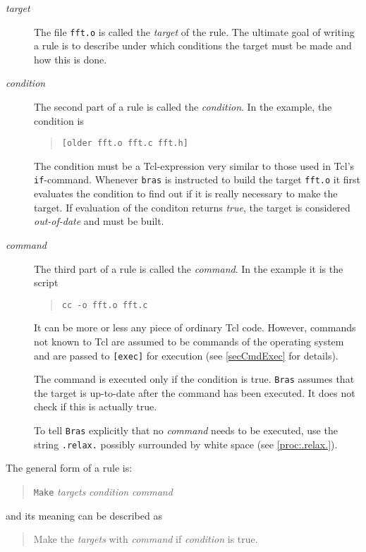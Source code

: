 \documentclass[11pt]{scrartcl}
\makeatletter
\newcommand{\bras}{\texttt{bras}}
\newcommand{\Bras}{\texttt{Bras}}
\newcommand{\Index}[1]{#1\index{#1}}
\newcommand{\Indextt}[1]{\texttt{#1}\index{#1@\texttt{#1}}}
\makeatother
\begin{document}
\begin{description}
\item[\textit{target}] The file \texttt{fft.o} is called the
  \textit{target} of the rule. The ultimate goal of writing a rule is
  to describe under which conditions the target must be made and how
  this is done. 
\item[\textit{condition}] The second part of a rule
  is called the \textit{condition}. In the example, the condition is
  \begin{quote}
  \texttt{[older fft.o {fft.c fft.h}]}
  \end{quote}
  The condition must be a Tcl-expression very similar to
  those used in Tcl's \texttt{if}-command. Whenever \bras{} is
  instructed to build the target \texttt{fft.o} it first evaluates the
  condition to find out if it is really necessary to make the
  target. If evaluation of the conditon returns \textit{true}, the
  target is considered \textit{out-of-date} and must be built.
\item[\textit{command}] The third part of a rule is
  called the \textit{command}. In the example it is the script
  \begin{quote}
    \texttt{cc -o fft.o fft.c}
  \end{quote}
  It can be more or less any piece of ordinary Tcl code. However,
  commands not known to Tcl are assumed to be commands of the
  operating system and are passed to \texttt{[exec]} for execution
  (see \ref{secCmdExec} for details).
  
  The command is executed only if the condition is true. \Bras{}
  assumes that the target is up-to-date after the command has been
  executed. It does not check if this is actually true.
  
  To tell \Bras{} explicitly that no \textit{command} needs to be
  executed, use the string \Indextt{.relax.} possibly surrounded by
  white space (see \ref{proc:.relax.}).
\end{description}

The general form of a \Index{rule} is:
\begin{quote}
  \texttt{Make} \textit{targets} \textit{condition} \textit{command}
\end{quote}
and its meaning can be described as
\begin{quote}
  Make the \textit{targets} with \textit{command} if
  \textit{condition} is true.
\end{quote}
\end{document}
